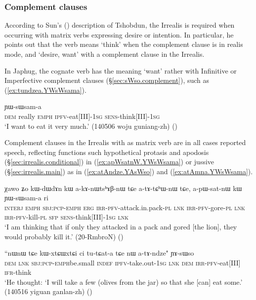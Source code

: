 \subsubsection{Complement clauses} \label{sec:irrealis.complement.clauses}
According to Sun's (\citeyear[807]{jackson07irrealis}) description of Tshobdun, the Irrealis is required when occurring with matrix verbs expressing desire or intention. In particular, he points out that the verb  means `think' when the complement clause is in realis mode, and `desire, want' with a complement clause in the Irrealis.

In Japhug, the cognate verb  has the meaning `want' rather with Infinitive or Imperfective complement clauses (§\ref{sec:sWso.complement}), such as (\ref{ex:tundzea.YWsWsama}).

\begin{exe}
\ex \label{ex:tundzea.YWsWsama}
 ɲɯ-sɯsam-a \\
\textsc{dem} really \textsc{emph} \textsc{ipfv}-eat[III]-\textsc{1sg} \textsc{sens}-think[III]-\textsc{1sg} \\
\glt `I want to eat it very much.' (140506 woju guniang-zh)
()
\end{exe}

Complement clauses in the Irrealis with  as matrix verb are in all cases reported speech, reflecting functions such  hypothetical protasis and apodosis (§\ref{sec:irrealis.conditional}) in (\ref{ex:apWsatnW.YWsWsama}) or jussive (§\ref{sec:irrealis.main}) as in (\ref{ex:atAndze.YAsWso}) and (\ref{ex:atAmna.YWsWsama}). 

\begin{exe}
\ex \label{ex:apWsatnW.YWsWsama}
\gll  χawo ʑo kɯ-dɯ\redp{}dɤn kɯ a-kɤ-nɯtsʰɤβ-nɯ tɕe a-tɤ-tɕʰɯ-nɯ tɕe, a-pɯ-sat-nɯ kɯ ɲɯ-sɯsam-a ri \\
\textsc{interj} \textsc{emph} \textsc{sbj}:\textsc{pcp}-\textsc{emph}\redp{} \textsc{erg} \textsc{irr}-\textsc{pfv}-attack.in.pack-\textsc{pl} \textsc{lnk} \textsc{irr}-\textsc{pfv}-gore-\textsc{pl} \textsc{lnk} \textsc{irr}-\textsc{pfv}-kill-\textsc{pl} \textsc{sfp} \textsc{sens}-think[III]-\textsc{1sg} \textsc{lnk} \\
\glt `I am thinking that if only they attacked in a pack and gored [the lion], they would probably kill it.' (20-RmbroN) ()
\end{exe}

\begin{exe}
\ex \label{ex:atAndze.YAsWso}
\gll ``nɯnɯ tɕe kɯ-xtɕɯ\redp{}xtɕi ci tu-tɕat-a tɕe nɯ a-tɤ-ndze" ɲɤ-sɯso \\
\textsc{dem} \textsc{lnk} \textsc{sbj}:\textsc{pcp}-\textsc{emph}\redp{}be.small \textsc{indef} \textsc{ipfv}-take.out-\textsc{1sg} \textsc{lnk} \textsc{dem} \textsc{irr}-\textsc{pfv}-eat[III] \textsc{ifr}-think \\
\glt `He thought: `I will take a few (olives from the jar) so that she [can] eat some.' (140516 yiguan ganlan-zh)
()
\end{exe}


